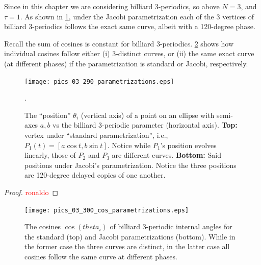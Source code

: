 Since in this chapter we are considering billiard 3-periodics, so above $N=3$, and $\tau=1$. As shown in \cref{fig:03-jacobi-param}, under the Jacobi parametrization each of the 3 vertices of billiard 3-periodics follows the exact same curve, albeit with a 120-degree phase.



Recall the sum of cosines is constant for billiard 3-periodics. \cref{fig:03-jacobi-cos-param} shows how individual cosines follow either (i) 3-distinct curves, or (ii) the same exact curve (at different phases) if the parametrization is standard or Jacobi, respectively.

\begin{figure}
    \centering
    \texttt{[image: pics\_03\_290\_parametrizations.eps]}
    \caption{The ``position'' $\theta_i$ (vertical axis) of a point on an ellipse with semi-axes $a,b$ vs the billiard 3-periodic parameter (horizontal axis). \textbf{Top:} vertex  under ``standard parametrization'', i.e., $P_1(t)=[a\cos{t},b\sin{t}]$. Notice while $P_1$'s position evolves linearly, those of $P_2$ and $P_3$ are different curves. \textbf{Bottom:} Said positions under Jacobi's parametrization. Notice the three positions are 120-degree delayed copies of one another.}. 
    \label{fig:03-jacobi-param}
\end{figure}

\begin{proof}
\textcolor{red}{ronaldo}
\end{proof}
\begin{figure}
    \centering
    \texttt{[image: pics\_03\_300\_cos\_parametrizations.eps]}
    \caption{The cosines $\cos(theta_i)$ of billiard 3-periodic internal angles for the standard (top) and Jacobi parametrizations (bottom). While in the former case the three curves are distinct, in the latter case all cosines follow the same curve at different phases.}
    \label{fig:03-jacobi-cos-param}
\end{figure}
